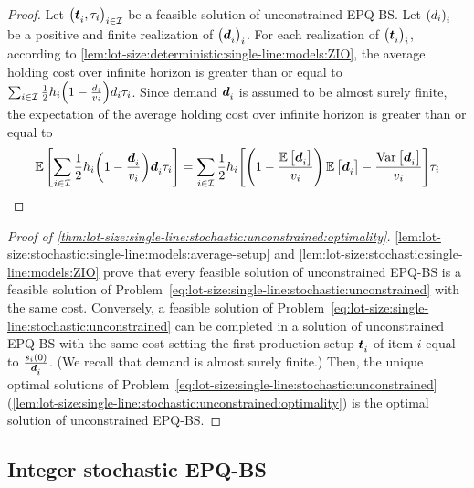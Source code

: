 \begin{proof}
Let $\bracket{\va t_i,\cover_i}_{i\in\REF}$ be a feasible solution of unconstrained EPQ-BS.
Let $\bracket{\demand_i}_i$ be a positive and finite realization of $\bracket{\va\demand_i}_i$.
For each realization of $\bracket{\va t_i}_i$, according to \cref{lem:lot-size:deterministic:single-line:models:ZIO}, the average holding cost over infinite horizon is greater than or equal to 
$\sum_{i\in\REF}\frac{1}{2}\holding_i\bracket{1-\frac{\demand_i}{\rate_i}}\demand_i\cover_i$.
Since demand $\va\demand_i$ is assumed to be almost surely finite, the expectation of the average holding cost over infinite horizon is greater than or equal to 
\begin{equation}
  \espe\sqbracket{\sum_{i\in\REF}\frac{1}{2}\holding_i\bracket{1-\frac{\va\demand_i}{\rate_i}}\va\demand_i\cover_i}
  =
  \sum_{i\in\REF}\frac{1}{2}\holding_i\sqbracket{\bracket{1-\frac{\espe\sqbracket{\va\demand_i}}{\rate_i}}\espe\sqbracket{\va\demand_i} - \frac{\vari\sqbracket{\va\demand_i}}{\rate_i}}\cover_i
\end{equation}
\end{proof}


\begin{proof}[Proof of \cref{thm:lot-size:single-line:stochastic:unconstrained:optimality}]
\cref{lem:lot-size:stochastic:single-line:models:average-setup} and \cref{lem:lot-size:stochastic:single-line:models:ZIO} prove that every feasible solution of unconstrained EPQ-BS is a feasible solution of Problem~\eqref{eq:lot-size:single-line:stochastic:unconstrained} with the same cost.
Conversely, a feasible solution of Problem~\eqref{eq:lot-size:single-line:stochastic:unconstrained} can be completed in a solution of unconstrained EPQ-BS with the same cost setting the first production setup $\va t_i$ of item $i$ equal to $\frac{\inventory_i(0)}{\va\demand_i}$.
(We recall that demand is almost surely finite.)
Then, the unique optimal solutions of Problem~\eqref{eq:lot-size:single-line:stochastic:unconstrained} (\cref{lem:lot-size:single-line:stochastic:unconstrained:optimality}) is the optimal solution of unconstrained EPQ-BS.
\end{proof}


\subsection{Integer stochastic EPQ-BS}


